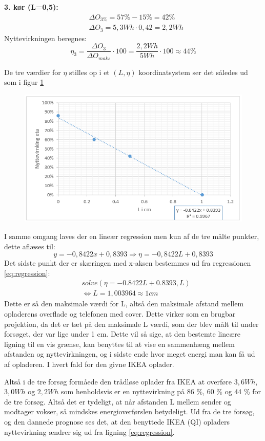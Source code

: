 \textbf{3. kør (L=0,5):}
\begin{align*}
& \Delta O_{3\%} = 57\%-15\% =  42\%  \\
& \Delta O_3 = 5,3 Wh \cdot 0,42 = 2,2 Wh
\end{align*}
Nyttevirkningen beregnes:
\begin{equation}
\eta_3 = \frac{\Delta O_3}{\Delta O_{maks}} \cdot 100 = \frac{2,2 Wh}{5 Wh} \cdot 100 \approx 44 \%
\label{eq:nyt3}
\end{equation}

De tre værdier for $\eta$ stilles op i et $(L,\eta)$ koordinatsystem ser det således ud som i figur \ref{figure:graf4}

\begin{figure}[H]
\includegraphics[width=1\textwidth]{Setup/forsg2_graf4}
\caption{}
\label{figure:graf4}
\end{figure}
I samme omgang laves der en lineær regression men kun af de tre målte punkter, dette aflæses til:
\begin{equation}
y=-0,8422x+0,8393 \Rightarrow \eta = -0,8422L+0,8393
\label{eq:regression}
\end{equation}
Det sidste punkt der er skæringen med x-aksen bestemmes ud fra regressionen \ref{eq:regression}:
\begin{align*}
& solve(\eta =-0.8422L+0.8393,L) \\
& \Leftrightarrow L = 1,003964 \approx 1 cm
\end{align*} 
Dette er så den maksimale værdi for L, altså den maksimale afstand mellem opladerens overflade og telefonen med cover. Dette virker som en brugbar projektion, da det er tæt på den maksimale L værdi, som der blev målt til under forsøget, der var lige under 1 cm. Dette vil så sige, at den bestemte lineære ligning til en vis grænse, kan benyttes til at vise en sammenhæng mellem afstanden og nyttevirkningen, og i sidste ende hvor meget energi man kan få ud af opladeren. I hvert fald for den givne IKEA oplader.

Altså i de tre forsøg formåede den trådløse oplader fra IKEA at overføre $3,6 Wh$, $3,0 Wh$ og $2,2 Wh$ som henholdsvis er en nyttevirkning på 86 \%, 60 \% og 44 \% for de tre forsøg. Altså det er tydeligt, at når afstanden L mellem sender og modtager vokser, så mindskes energioverførslen betydeligt. Ud fra de tre forsøg, og den dannede prognose ses det, at den benyttede IKEA (QI) opladers nyttevirkning ændrer sig ud fra ligning \ref{eq:regression}.
